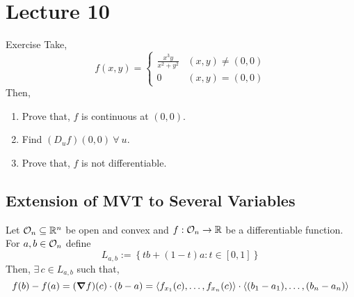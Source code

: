 \documentclass[../Analysis-3.tex]{subfiles}
\begin{document}
\chapter*{Lecture 10} %
\setcounter{chapter}{10} %


\begin{Eg}{Exercise}{}
  Take, \[ f(x,y) = \begin{cases}
      \frac{x^{3}y}{x^2 + y^2} & (x,y) \neq (0,0) \\
      0                        & (x,y) = (0,0)
    \end{cases}\]
  Then,
  \begin{enumerate}[label=(\roman*)]
    \item Prove that, $f$ is continuous at $(0,0)$.
    \item Find $(D_{u}f)(0,0)\ \forall\ u$.
    \item Prove that, $f$ is not differentiable.
  \end{enumerate}
\end{Eg}

\section{Extension of MVT to Several Variables}

\begin{Thm}{}{}
  Let $ \mathcal{O}_{n} \subseteq \mathbb{R}^n $ be open and convex and $f : \mathcal{O}_{n} \to \mathbb{R}$ be a differentiable function. For $a,b \in \mathcal{O}_{n}$ define \[L_{a,b} := \left\{ tb + (1-t)a : t \in [0,1]\right\} \]
  Then, $\exists\, c \in L_{a,b}$ such that, \[ f(b) - f(a) = (\grad f)(c)\cdot (b-a) = \left\langle f_{x_1}(c), \ldots, f_{x_n}(c) \right\rangle \cdot \left\langle (b_1 - a_1), \ldots, (b_n - a_n) \right\rangle  \]
\end{Thm}
\end{document}
